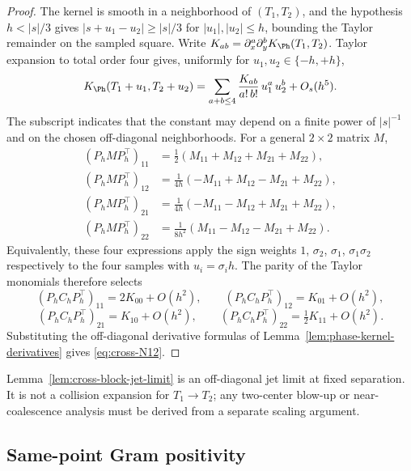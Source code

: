 \begin{proof}
The kernel is smooth in a neighborhood of \((T_1, T_2)\), and the
hypothesis \(h<|s|/3\) gives
\(|s+u_1-u_2|\ge |s|/3\) for \(|u_1|,|u_2|\le h\), bounding the
Taylor remainder on the sampled square.  Write
\(K_{ab} = \partial_x^a \partial_y^b K_\Ph(T_1, T_2)\).  Taylor
expansion to total order four gives, uniformly for
\(u_1, u_2 \in \{-h, +h\}\),
\[
K_\Ph(T_1+u_1, T_2+u_2)
= \sum_{a+b\le 4}\frac{K_{ab}}{a!\,b!}\, u_1^a\, u_2^b + O_s(h^5).
\]
The subscript indicates that the constant may depend on a finite power
of \(|s|^{-1}\) and on the chosen off-diagonal neighborhoods.  For a
general \(2\times 2\) matrix \(M\),
\begin{align*}
(P_h M P_h^\top)_{11}
&= \tfrac12(M_{11} + M_{12} + M_{21} + M_{22}),\\
(P_h M P_h^\top)_{12}
&= \tfrac{1}{4h}(-M_{11} + M_{12} - M_{21} + M_{22}),\\
(P_h M P_h^\top)_{21}
&= \tfrac{1}{4h}(-M_{11} - M_{12} + M_{21} + M_{22}),\\
(P_h M P_h^\top)_{22}
&= \tfrac{1}{8h^2}(M_{11} - M_{12} - M_{21} + M_{22}).
\end{align*}
Equivalently, these four expressions apply the sign weights
\(1\), \(\sigma_2\), \(\sigma_1\), \(\sigma_1\sigma_2\) respectively to
the four samples with \(u_i = \sigma_i h\).  The parity of the Taylor
monomials therefore selects
\[
(P_h C_h P_h^\top)_{11} = 2 K_{00} + O(h^2),\qquad
(P_h C_h P_h^\top)_{12} = K_{01} + O(h^2),
\]
\[
(P_h C_h P_h^\top)_{21} = K_{10} + O(h^2),\qquad
(P_h C_h P_h^\top)_{22} = \tfrac12 K_{11} + O(h^2).
\]
Substituting the off-diagonal derivative formulas of
Lemma~\ref{lem:phase-kernel-derivatives} gives \eqref{eq:cross-N12}.
\end{proof}

\begin{remark}
\label{rem:cross-block-fixed-separation-scope}
Lemma~\ref{lem:cross-block-jet-limit} is an off-diagonal jet limit at
fixed separation.  It is not a collision expansion for \(T_1\to T_2\);
any two-center blow-up or near-coalescence analysis must be derived
from a separate scaling argument.
\end{remark}

\subsection{Same-point Gram positivity}
\label{subsec:same-point-gram-positivity}

